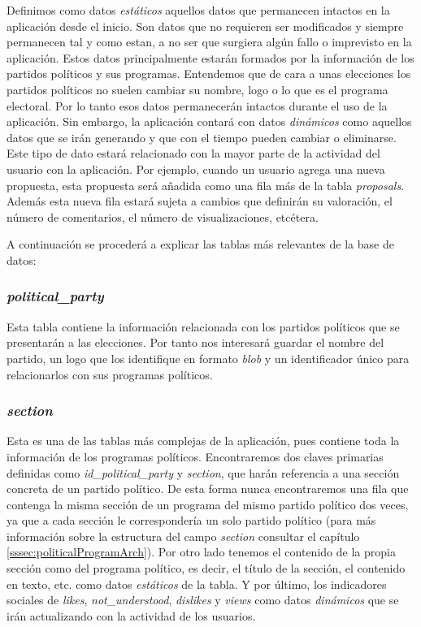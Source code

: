 Definimos como datos \textit{estáticos} aquellos datos que permanecen intactos en la aplicación desde el inicio. Son datos que no requieren ser modificados y siempre permanecen tal y como estan, a no ser que surgiera algún fallo o imprevisto en la aplicación. Estos datos principalmente estarán formados por la información de los partidos políticos y sus programas. Entendemos que de cara a unas elecciones los partidos políticos no suelen cambiar su nombre, logo o lo que es el programa electoral. Por lo tanto esos datos permanecerán intactos durante el uso de la aplicación. Sin embargo, la aplicación contará con datos \textit{dinámicos} como aquellos datos que se irán generando y que con el tiempo pueden cambiar o eliminarse. Este tipo de dato estará relacionado con la mayor parte de la actividad del usuario con la aplicación. Por ejemplo, cuando un usuario agrega una nueva propuesta, esta propuesta será añadida como una fila más de la tabla \textit{proposals}. Además esta nueva fila estará sujeta a cambios que definirán su valoración, el número de comentarios, el número de visualizaciones, etcétera.

A continuación se procederá a explicar las tablas más relevantes de la base de datos:

\subsubsection{\textit{political\_party}}

Esta tabla contiene la información relacionada con los partidos políticos que se presentarán a las elecciones. Por tanto nos interesará guardar el nombre del partido, un logo que los identifique en formato \textit{blob} y un identificador único para relacionarlos con sus programas políticos.

\subsubsection{\textit{section}}

Esta es una de las tablas más complejas de la aplicación, pues contiene toda la información de los programas políticos. Encontraremos dos claves primarias definidas como \textit{id\_political\_party} y \textit{section}, que harán referencia a una sección concreta de un partido político. De esta forma nunca encontraremos una fila que contenga la misma sección de un programa del mismo partido político dos veces, ya que a cada sección le correspondería un solo partido político (para más información sobre la estructura del campo \textit{section} consultar el capítulo \ref{sssec:politicalProgramArch}). Por otro lado tenemos el contenido de la propia sección como del programa político, es decir, el título de la sección, el contenido en texto, etc. como datos \textit{estáticos} de la tabla. Y por último, los indicadores sociales de \textit{likes}, \textit{not\_understood}, \textit{dislikes} y \textit{views} como datos \textit{dinámicos} que se irán actualizando con la actividad de los usuarios.

